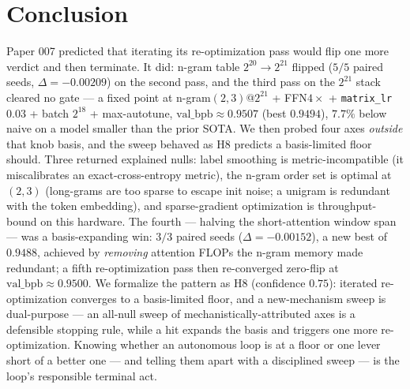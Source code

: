 \documentclass{article}
\newcommand{\valbpb}{\mathrm{val\_bpb}}
\begin{document}
\section{Conclusion}
\label{sec:conclusion}

Paper 007 predicted that iterating its re-optimization pass would flip one more verdict and then terminate. It did: n-gram table $2^{20} \rightarrow 2^{21}$ flipped ($5/5$ paired seeds, $\Delta = -0.00209$) on the second pass, and the third pass on the $2^{21}$ stack cleared no gate --- a fixed point at n-gram$(2,3)$@$2^{21}$ + FFN$4\times$ + \texttt{matrix\_lr} $0.03$ + batch $2^{18}$ + max-autotune, $\valbpb \approx 0.9507$ (best $0.9494$), $7.7\%$ below naive on a model smaller than the prior SOTA. We then probed four axes \emph{outside} that knob basis, and the sweep behaved as H8 predicts a basis-limited floor should. Three returned explained nulls: label smoothing is metric-incompatible (it miscalibrates an exact-cross-entropy metric), the n-gram order set is optimal at $(2,3)$ (long-grams are too sparse to escape init noise; a unigram is redundant with the token embedding), and sparse-gradient optimization is throughput-bound on this hardware. The fourth --- halving the short-attention window span --- was a basis-expanding win: $3/3$ paired seeds ($\Delta = -0.00152$), a new best of $0.9488$, achieved by \emph{removing} attention FLOPs the n-gram memory made redundant; a fifth re-optimization pass then re-converged zero-flip at $\valbpb \approx 0.9500$. We formalize the pattern as H8 (confidence $0.75$): iterated re-optimization converges to a basis-limited floor, and a new-mechanism sweep is dual-purpose --- an all-null sweep of mechanistically-attributed axes is a defensible stopping rule, while a hit expands the basis and triggers one more re-optimization. Knowing whether an autonomous loop is at a floor or one lever short of a better one --- and telling them apart with a disciplined sweep --- is the loop's responsible terminal act.


\end{document}
